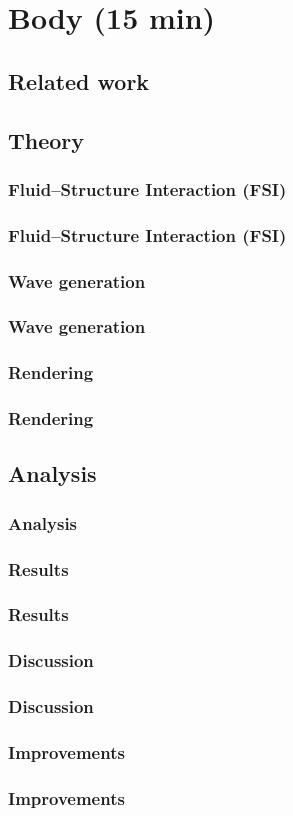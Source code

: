 
\section{Body (15 min)}

\subsection{Related work}



\subsection{Theory}







\subsubsection{Fluid--Structure Interaction (FSI)}
\begin{frame}
\frametitle{Fluid--Structure Interaction (FSI)}
\end{frame}

\subsubsection{Wave generation}
\begin{frame}
\frametitle{Wave generation}
\end{frame}

\subsubsection{Rendering}
\begin{frame}
\frametitle{Rendering}
\end{frame}


\subsection{Analysis}
\begin{frame}
\frametitle{Analysis}
\end{frame}

\subsubsection{Results}
\begin{frame}
\frametitle{Results}
\end{frame}

\subsubsection{Discussion}
\begin{frame}
\frametitle{Discussion}
\end{frame}

\subsubsection{Improvements}
\begin{frame}
\frametitle{Improvements}
\end{frame}

\begin{frame}
\frametitle{}
\end{frame}


